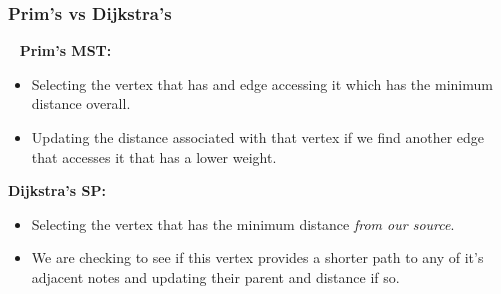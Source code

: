 \documentclass{beamer}
\begin{document}
\begin{frame}[fragile]
	\frametitle{Prim's vs Dijkstra's }
    \begin{minipage}{0.45\textwidth}\
        \vfill
        \footnotesize
        \noindent\textbf{Prim's MST:}\\
        \tiny
        \begin{algorithm}[H]
            \DontPrintSemicolon
        \end{algorithm}
        \begin{itemize}
            \item Selecting the vertex that has and edge accessing it which has the minimum distance overall.
            \item Updating the distance associated with that vertex if we find another edge that accesses it that has a lower weight.
        \end{itemize}
    \end{minipage}
    \hfill
    \vline
    \hfill
    \begin{minipage}{0.49\textwidth}
        \footnotesize
        \vfill
        \noindent\textbf{Dijkstra's SP:}\\
        \tiny
        \begin{algorithm}[H]
            \DontPrintSemicolon
        \end{algorithm}
        \begin{itemize}
            \item Selecting the vertex that has the minimum distance \textit{from our source}.
            \item We are checking to see if this vertex provides a shorter path
                to any of it's adjacent notes and updating their parent and
                distance if so.
        \end{itemize}
    \end{minipage}
\end{frame}
\end{document}
